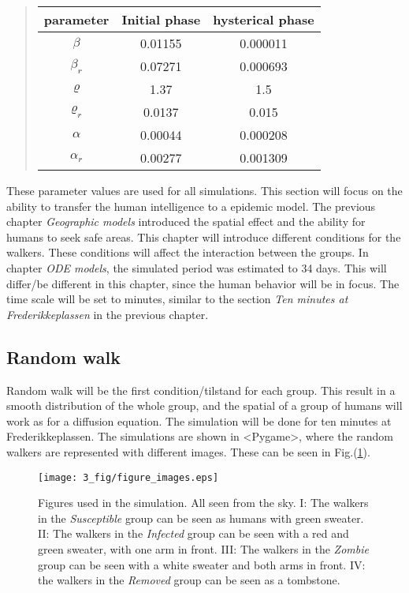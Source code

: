 \documentclass[%
twoside,                 %
final,                   %
chapterprefix=true,      %
open=right               %
10pt]{book}
\begin{document}
\begin{quote}
\begin{tabular}{ccc}
\hline
\multicolumn{1}{c}{ parameter } & \multicolumn{1}{c}{ Initial phase } & \multicolumn{1}{c}{ hysterical phase } \\
\hline
$\beta$          & 0.01155          & 0.000011         \\
$\beta_r$        & 0.07271          & 0.000693         \\
$\varrho$        & 1.37             & 1.5              \\
$\varrho_r$      & 0.0137           & 0.015            \\
$\alpha$         & 0.00044          & 0.000208         \\
$\alpha_r$       & 0.00277          & 0.001309         \\
\hline
\end{tabular}
\end{quote}

\noindent
These parameter values are used for all simulations. This section will focus on the ability to transfer the human intelligence to a epidemic model. The previous chapter \emph{Geographic models} introduced the spatial effect and the ability for humans to seek safe areas. This chapter will introduce different conditions for the walkers. These conditions will affect the interaction between the groups. In chapter \emph{ODE models}, the simulated period was estimated to 34 days. This will differ/be different in this chapter, since the human behavior will be in focus. The time scale will be set to minutes, similar to the section \emph{Ten minutes at Frederikkeplassen} in the previous chapter. 

\subsection{Random walk}
Random walk will be the first condition/tilstand for each group. This result in a smooth distribution of the whole group, and the spatial of a group of humans will work as for a diffusion equation. The simulation will be done for ten minutes at Frederikkeplassen. The simulations are shown in <Pygame>, where the random walkers are represented with different images. These can be seen in Fig.(\ref{fig:figure_images}).


\begin{figure}[ht]
  \centerline{\texttt{[image: 3\_fig/figure\_images.eps]}}
  \caption{
  \label{fig:figure_images} Figures used in the simulation. All seen from the sky. I: The walkers in the \emph{Susceptible} group can be seen as humans with green sweater. II: The walkers in the \emph{Infected} group can be seen with a red and green sweater, with one arm in front. III: The walkers in the \emph{Zombie} group can be seen with a white sweater and both arms in front. IV: the walkers in the \emph{Removed} group can be seen as a tombstone.
  }
\end{figure}
\end{document}
